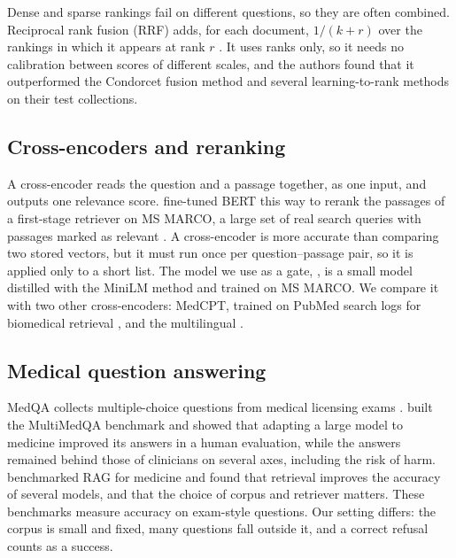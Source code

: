 Dense and sparse rankings fail on different questions, so they are often combined. Reciprocal rank fusion (RRF) adds, for each document, $1/(k + r)$ over the rankings in which it appears at rank $r$ \citep{cormack2009rrf}. It uses ranks only, so it needs no calibration between scores of different scales, and the authors found that it outperformed the Condorcet fusion method and several learning-to-rank methods on their test collections.

\subsection{Cross-encoders and reranking}

A cross-encoder reads the question and a passage together, as one input, and outputs one relevance score. \citet{nogueira2019passage} fine-tuned BERT this way to rerank the passages of a first-stage retriever on MS MARCO, a large set of real search queries with passages marked as relevant \citep{bajaj2016msmarco}. A cross-encoder is more accurate than comparing two stored vectors, but it must run once per question--passage pair, so it is applied only to a short list. The model we use as a gate,  \citep{minilmcard}, is a small model distilled with the MiniLM method \citep{wang2020minilm} and trained on MS MARCO. We compare it with two other cross-encoders: MedCPT, trained on PubMed search logs for biomedical retrieval \citep{jin2023medcpt}, and the multilingual  \citep{bgererankercard}.

\subsection{Medical question answering}

MedQA collects multiple-choice questions from medical licensing exams \citep{jin2021medqa}. \citet{singhal2023clinical} built the MultiMedQA benchmark and showed that adapting a large model to medicine improved its answers in a human evaluation, while the answers remained behind those of clinicians on several axes, including the risk of harm. \citet{xiong2024medrag} benchmarked RAG for medicine and found that retrieval improves the accuracy of several models, and that the choice of corpus and retriever matters. These benchmarks measure accuracy on exam-style questions. Our setting differs: the corpus is small and fixed, many questions fall outside it, and a correct refusal counts as a success.

